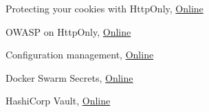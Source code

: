 \documentclass[a4paper,12pt,oneside,openright]{memoir}
\begin{document}
\begin{thebibliography}{5}
 Protecting your cookies with HttpOnly,
\href{http://blog.codinghorror.com/protecting-your-cookies-httponly/}{Online}

 OWASP on HttpOnly,
\href{https://www.owasp.org/index.php/HttpOnly}{Online}

 Configuration management,
\href{https://en.wikipedia.org/wiki/Configuration_management}{Online}

 Docker Swarm Secrets,
\href{https://docs.docker.com/engine/swarm/secrets/}{Online}

 HashiCorp Vault,
\href{https://www.vaultproject.io/}{Online}


\end{thebibliography}
%
\end{document}
